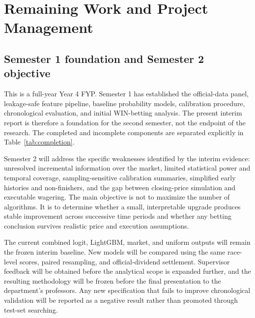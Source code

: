 \section{Remaining Work and Project Management}\label{sec:plan}

\subsection{Semester 1 foundation and Semester 2 objective}\label{sec:plan-priorities}
This is a full-year Year 4 FYP. Semester 1 has established the official-data panel, leakage-safe feature pipeline, baseline probability models, calibration procedure, chronological evaluation, and initial WIN-betting analysis. The present interim report is therefore a foundation for the second semester, not the endpoint of the research. The completed and incomplete components are separated explicitly in Table~\ref{tab:completion}.

Semester 2 will address the specific weaknesses identified by the interim evidence: unresolved incremental information over the market, limited statistical power and temporal coverage, sampling-sensitive calibration summaries, simplified early histories and non-finishers, and the gap between closing-price simulation and executable wagering. The main objective is not to maximize the number of algorithms. It is to determine whether a small, interpretable upgrade produces stable improvement across successive time periods and whether any betting conclusion survives realistic price and execution assumptions.

The current combined logit, LightGBM, market, and uniform outputs will remain the frozen interim baseline. New models will be compared using the same race-level scores, paired resampling, and official-dividend settlement. Supervisor feedback will be obtained before the analytical scope is expanded further, and the resulting methodology will be frozen before the final presentation to the department's professors. Any new specification that fails to improve chronological validation will be reported as a negative result rather than promoted through test-set searching.


